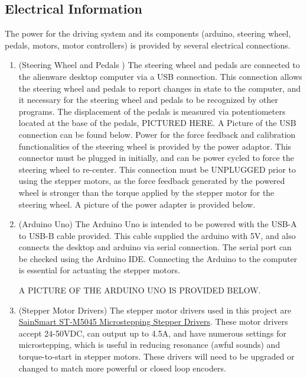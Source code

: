 \documentclass[12pt,oneside,letterpaper]{article}
\begin{document}
\subsection{Electrical Information}
The power for the driving system and its components (arduino, steering wheel, pedals, motors, motor controllers) is provided by several electrical connections.
\begin{enumerate}

\item(Steering Wheel and Pedals ) The steering wheel and pedals are connected to the alienware desktop computer via a USB connection. This connection allows the steering wheel and pedals to report changes in state to the computer, and it necessary for the steering wheel and pedals to be recognized by other programs. The displacement of the pedals is measured via potentiometers located at the base of the pedals, PICTURED HERE. A Picture of the USB connection can be found below. Power for the force feedback and calibration functionalities of the steering wheel is provided by the power adaptor. This connector must be plugged in initially, and can be power cycled to force the steering wheel to re-center. This connection must be UNPLUGGED prior to using the stepper motors, as the force feedback generated by the powered wheel is stronger than the torque applied by the stepper motor for the steering wheel. A picture of the power adapter is provided below.

\item(Arduino Uno) The Arduino Uno is intended to be powered with the USB-A to USB-B cable provided. This cable supplied the arduino with 5V, and also connects the desktop and arduino via serial connection. The serial port can be checked using the Arduino IDE. Connecting the Arduino to the computer is essential for actuating the stepper motors.

A PICTURE OF THE ARDUINO UNO IS PROVIDED BELOW.

\item(Stepper Motor Drivers) The stepper motor drivers used in this project are \href{https://www.amazon.com/SainSmart-Micro-Stepping-Stepper-Driver-ST-M5045/dp/B00DFSF9GE/ref=cm_cr_arp_d_product_top?ie=UTF8}{SainSmart ST-M5045 Microstepping Stepper Drivers}. These motor drivers accept 24-50VDC, can output up to 4.5A, and have numerous settings for microstepping, which is useful in reducing resonance (awful sounds) and torque-to-start in stepper motors. These drivers will need to be upgraded or changed to match more powerful or closed loop encoders.


\end{enumerate}
\end{document}
